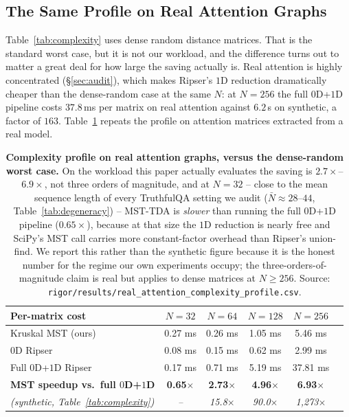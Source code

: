 \documentclass{article}
\begin{document}
\subsection{The Same Profile on Real Attention Graphs}
\label{app:complexity_real}
Table~\ref{tab:complexity} uses dense random distance matrices. That is the standard worst case, but it is not our workload, and the difference turns out to matter a great deal for how large the saving actually is. Real attention is highly concentrated (\S\ref{sec:audit}), which makes Ripser's $1$D reduction dramatically cheaper than the dense-random case at the same $N$: at $N{=}256$ the full $0$D+$1$D pipeline costs $37.8$\,ms per matrix on real attention against $6.2$\,s on synthetic, a factor of $163$. Table~\ref{tab:complexity_real} repeats the profile on attention matrices extracted from a real model.

\begin{table}[ht]
\centering
\small
\begin{tabular}{lccccc}
\toprule
\textbf{Per-matrix cost} & \textbf{$N=32$} & \textbf{$N=64$} & \textbf{$N=128$} & \textbf{$N=256$} \\
\midrule
Kruskal MST (ours) & 0.27 ms & 0.26 ms & 1.05 ms & 5.46 ms \\
$0$D Ripser & 0.08 ms & 0.15 ms & 0.62 ms & 2.99 ms \\
Full $0$D+$1$D Ripser & 0.17 ms & 0.71 ms & 5.19 ms & 37.81 ms \\
\midrule
\textbf{MST speedup vs.\ full $0$D+$1$D} & \textbf{0.65$\times$} & \textbf{2.73$\times$} & \textbf{4.96$\times$} & \textbf{6.93$\times$} \\
\textit{(synthetic, Table~\ref{tab:complexity})} & \textit{--} & \textit{15.8$\times$} & \textit{90.0$\times$} & \textit{1{,}273$\times$} \\
\bottomrule
\end{tabular}
\caption{\textbf{Complexity profile on real attention graphs, versus the dense-random worst case.} On the workload this paper actually evaluates the saving is $2.7\times$--$6.9\times$, not three orders of magnitude, and at $N{=}32$ -- close to the mean sequence length of every TruthfulQA setting we audit ($\bar N \approx 28$--$44$, Table~\ref{tab:degeneracy}) -- MST-TDA is \emph{slower} than running the full $0$D+$1$D pipeline ($0.65\times$), because at that size the $1$D reduction is nearly free and SciPy's MST call carries more constant-factor overhead than Ripser's union-find. We report this rather than the synthetic figure because it is the honest number for the regime our own experiments occupy; the three-orders-of-magnitude claim is real but applies to dense matrices at $N \ge 256$. Source: \texttt{rigor/results/real\_attention\_complexity\_profile.csv}.}
\label{tab:complexity_real}
\end{table}
\end{document}
